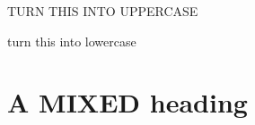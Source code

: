 \documentclass{article}
\begin{document}
\MakeTextUppercase{Turn this into uppercase}

\MakeTextLowercase{Turn THIS Into Lowercase}

\section{A \MakeTextUppercase{mixed} heading}
\end{document}
